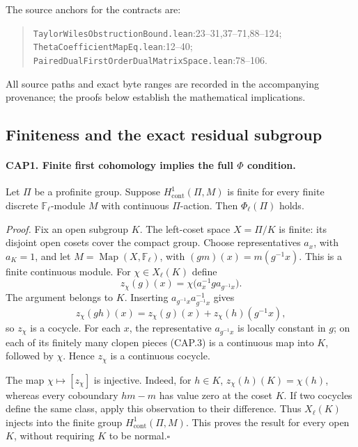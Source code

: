 The source anchors for the contracts are:
\begin{quote}\small
\nolinkurl{TaylorWilesObstructionBound.lean}:23--31,37--71,88--124;\\
\nolinkurl{ThetaCoefficientMapEq.lean}:12--40;\\
\nolinkurl{PairedDualFirstOrderDualMatrixSpace.lean}:78--106.
\end{quote}
All source paths and exact byte ranges are recorded in the accompanying
provenance; the proofs below establish the mathematical implications.

\subsection{Finiteness and the exact residual subgroup}

\paragraph{CAP1. Finite first cohomology implies the full $\Phi$ condition.}
\label{claim:CAP1}
Let $\Pi$ be a profinite group.  Suppose $H^1_{\mathrm{cont}}(\Pi,M)$
is finite for every finite discrete $\mathbb F_\ell$-module $M$ with
continuous $\Pi$-action.  Then $\Phi_\ell(\Pi)$ holds.

\emph{Proof.}
Fix an open subgroup $K$.  The left-coset space $X=\Pi/K$ is finite:
its disjoint open cosets cover the compact group.  Choose representatives
$a_x$, with $a_K=1$, and let $M=\operatorname{Map}(X,\mathbb F_\ell)$,
with $(g m)(x)=m(g^{-1}x)$.  This is a finite continuous module.  For
$\chi\in X_\ell(K)$ define
\[
 z_\chi(g)(x)
   =\chi\bigl(a_x^{-1}g a_{g^{-1}x}\bigr).
 \tag{CAP.3}
\]
The argument belongs to $K$.  Inserting $a_{g^{-1}x}a_{g^{-1}x}^{-1}$
gives
\[
 z_\chi(gh)(x)=z_\chi(g)(x)+z_\chi(h)(g^{-1}x),
\]
so $z_\chi$ is a cocycle.  For each $x$, the representative
$a_{g^{-1}x}$ is locally constant in $g$; on each of its finitely many
clopen pieces (CAP.3) is a continuous map into $K$, followed by
$\chi$.  Hence $z_\chi$ is a continuous cocycle.

The map $\chi\mapsto[z_\chi]$ is injective.  Indeed, for $h\in K$,
$z_\chi(h)(K)=\chi(h)$, whereas every coboundary $h m-m$ has value
zero at the coset $K$.  If two cocycles define the same class, apply
this observation to their difference.  Thus $X_\ell(K)$ injects into
the finite group $H^1_{\mathrm{cont}}(\Pi,M)$.  This proves the result
for every open $K$, without requiring $K$ to be normal.\hfill$\square$


